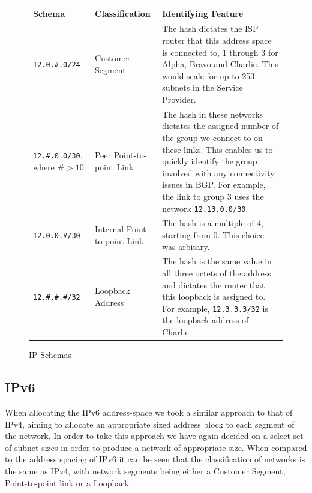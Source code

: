 \begin{figure}[!ht]
    \caption{IP Schemas}
    \label{figure:network-alloc-2}
    \centering
    \begin{tabular}{|p{3cm}|p{3cm}|p{5cm}|}
    \hline
    \textbf{Schema} & \textbf{Classification} & \textbf{Identifying Feature} \\

        \hline
        \texttt{12.0.\#.0/24} & Customer Segment & The hash dictates the ISP
router that this address space is connected to, 1 through 3 for Alpha, Bravo
and Charlie. This would scale for up to 253 subnets in the Service Provider.\\

		\hline
        \texttt{12.\#.0.0/30}, where $\#> 10$ & Peer Point-to-point Link &
The hash in these networks dictates the assigned number of the group we connect
to on these links. This enables us to quickly identify the group involved with
any connectivity issues in BGP. For example, the link to group 3 uses the
network \texttt{12.13.0.0/30}.\\

        \hline
        \texttt{12.0.0.\#/30} & Internal Point-to-point Link &
The hash is a multiple of 4, starting from 0. This choice was arbitary.\\

        \hline
        \texttt{12.\#.\#.\#/32} & Loopback Address & The hash is
the same value in all three octets of the address and dictates the router that
this loopback is assigned to. For example, \texttt{12.3.3.3/32} is the loopback
address of Charlie.\\
        \hline
    \end{tabular}
\end{figure}

\clearpage

\subsection{IPv6}
When allocating the IPv6 address-space we took a similar
approach to that of IPv4, aiming to allocate an appropriate sized address block
to each segment of the network. In order to take this approach we have again
decided on a select set of subnet sizes in order to produce a network of
appropriate size. When compared to the address spacing of IPv6 it can be seen
that the classification of networks is the same as IPv4, with network segments
being either a Customer Segment, Point-to-point link or a Loopback.

